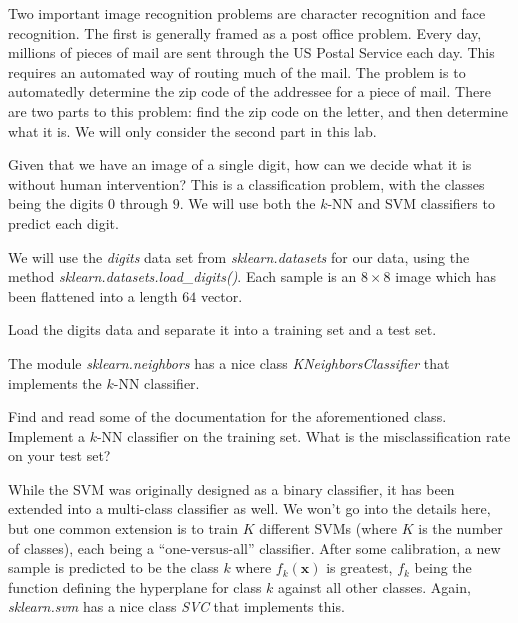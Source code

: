 

Two important image recognition problems are character recognition and face recognition. The first is generally framed as a post office problem. Every day, millions of pieces of mail are sent through the US Postal Service each day. This requires an automated way of routing much of the mail. The problem is to automatedly determine the zip code of the addressee for a piece of mail. There are two parts to this problem: find the zip code on the letter, and then determine what it is. We will only consider the second part in this lab.

Given that we have an image of a single digit, how can we decide what it is without human intervention? This is a classification problem, with the classes being the digits $0$ through $9$. We will use both the $k$-NN and SVM classifiers to predict each digit.

We will use the \emph{digits} data set from \emph{sklearn.datasets} for our data, using the method \emph{sklearn.datasets.load\_digits()}. Each sample is an $8 \times 8$ image which has been flattened into a length $64$ vector.

\begin{problem}
Load the digits data and separate it into a training set and a test set.
\end{problem}

The module \emph{sklearn.neighbors} has a nice class \emph{KNeighborsClassifier} that implements the $k$-NN classifier.

\begin{problem}
Find and read some of the documentation for the aforementioned class. Implement a $k$-NN classifier on the training set. What is the misclassification rate on your test set?
\end{problem}

While the SVM was originally designed as a binary classifier, it has been extended into a multi-class classifier as well. We won't go into the details here, but one common extension is to train $K$ different SVMs (where $K$ is the number of classes), each being a ``one-versus-all'' classifier. After some calibration, a new sample is predicted to be the class $k$ where $f_{k}(\mathbf{x})$ is greatest, $f_{k}$ being the function defining the hyperplane for class $k$ against all other classes. Again, \emph{sklearn.svm} has a nice class \emph{SVC} that implements this.


